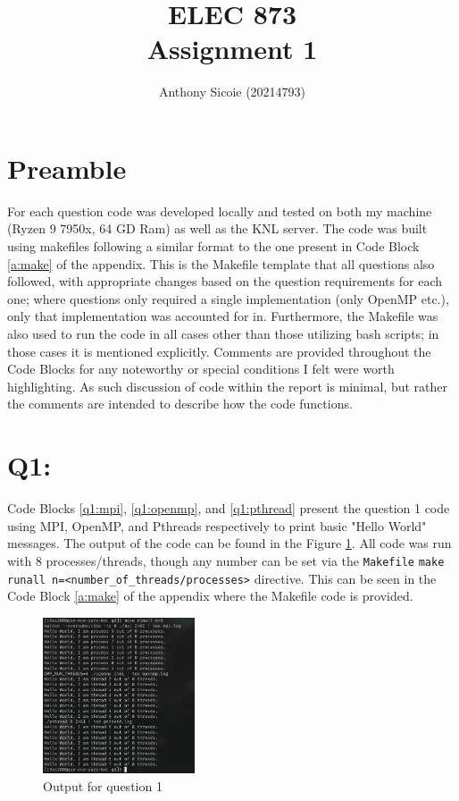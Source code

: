 \documentclass[11pt]{article}
\title{%
  ELEC 873 \\
Assignment 1}
\author{Anthony Sicoie (20214793)}
\begin{document}
\maketitle

\section*{Preamble}

For each question code was developed locally and tested on both my machine (Ryzen 9 7950x, 64 GD Ram) as well as the KNL server.
The code was built using makefiles following a similar format to the one present in Code Block \ref{a:make} of the appendix.
This is the Makefile template that all questions also followed, with appropriate changes based on the question requirements for each one; where questions only required a single implementation (only OpenMP etc.), only that implementation was accounted for in.
Furthermore, the Makefile was also used to run the code in all cases other than those utilizing bash scripts; in those cases it is mentioned explicitly.
Comments are provided throughout the Code Blocks for any noteworthy or special conditions I felt were worth highlighting.
As such discussion of code within the report is minimal, but rather the comments are intended to describe how the code functions.


\section*{Q1:}

Code Blocks \ref{q1:mpi}, \ref{q1:openmp}, and \ref{q1:pthread} present the question 1 code using MPI, OpenMP, and Pthreads respectively to print basic "Hello World" messages.
The output of the code can be found in the Figure \ref{fig:q1}.
All code was run with 8 processes/threads, though any number can be set via the \texttt{Makefile} \texttt{make runall n=<number\_of\_threads/processes>} directive. 
This can be seen in the Code Block \ref{a:make} of the appendix where the Makefile code is provided.






\begin{figure}[H]
\centering
    \includegraphics[width=0.4\textwidth]{./images/q1.png}
\caption{Output for question 1}
\label{fig:q1}
\end{figure}
\end{document}
